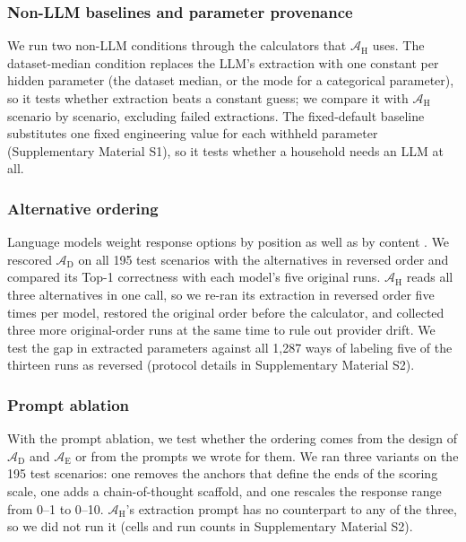 \documentclass[final,3p,times]{elsarticle}
\begin{document}
\subsubsection{Non-LLM baselines and parameter provenance}
\label{sec:hybrid-ablation-methods}
We run two non-LLM conditions through the calculators that $\mathcal{A}_{\text{H}}$ uses. The dataset-median condition replaces the LLM's extraction with one constant per hidden parameter (the dataset median, or the mode for a categorical parameter), so it tests whether extraction beats a constant guess; we compare it with $\mathcal{A}_{\text{H}}$ scenario by scenario, excluding failed extractions. The fixed-default baseline substitutes one fixed engineering value for each withheld parameter (Supplementary Material S1), so it tests whether a household needs an LLM at all.

\subsubsection{Alternative ordering}
\label{sec:alternative-order}
Language models weight response options by position as well as by content \cite{wang2024fairescalers,zheng2023judging}. We rescored $\mathcal{A}_{\text{D}}$ on all 195 test scenarios with the alternatives in reversed order and compared its Top-1 correctness with each model's five original runs. $\mathcal{A}_{\text{H}}$ reads all three alternatives in one call, so we re-ran its extraction in reversed order five times per model, restored the original order before the calculator, and collected three more original-order runs at the same time to rule out provider drift. We test the gap in extracted parameters against all 1,287 ways of labeling five of the thirteen runs as reversed (protocol details in Supplementary Material S2).

\subsubsection{Prompt ablation}
\label{sec:prompt-ablation-methods}
With the prompt ablation, we test whether the ordering comes from the design of $\mathcal{A}_{\text{D}}$ and $\mathcal{A}_{\text{E}}$ or from the prompts we wrote for them. We ran three variants on the 195 test scenarios: one removes the anchors that define the ends of the scoring scale, one adds a chain-of-thought scaffold, and one rescales the response range from 0--1 to 0--10. $\mathcal{A}_{\text{H}}$'s extraction prompt has no counterpart to any of the three, so we did not run it (cells and run counts in Supplementary Material S2).
\end{document}
